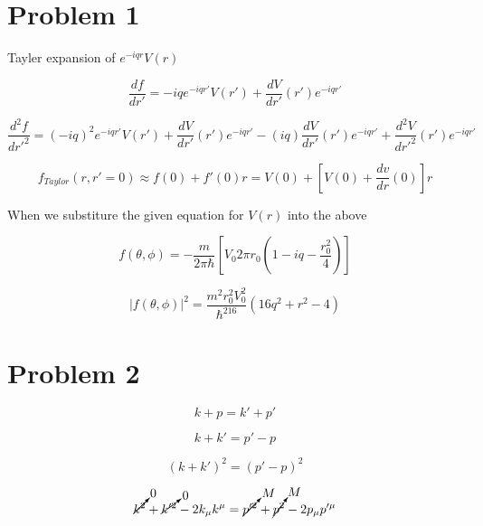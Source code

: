 \documentclass[12pt]{article}
\begin{document}
\maketitle

\section{Problem 1}
Tayler expansion of $e^{-iqr}V(r)$

\begin{equation}
  \frac{df}{dr'}=-iqe^{-iqr'}V(r')+\frac{dV}{dr'}(r')e^{-iqr'}
\end{equation}

\begin{equation}
  \frac{d^2f}{dr'^2}= (-iq)^2e^{-iqr'}V(r') + \frac{dV}{dr'}(r')e^{-iqr'} - (iq)\frac{dV}{dr'}(r')e^{-iqr'} + \frac{d^2V}{dr'^2}(r')e^{-iqr'}  
\end{equation}

\begin{equation}
  f_{Taylor}(r,r'=0) \approx f(0)+f'(0)r= V(0)+[V(0)+\frac{dv}{dr}(0)]r
\end{equation}

When we substiture the given equation for $V(r)$ into the above

\begin{equation}
  f(\theta,\phi)=-\frac{m}{2\pi\hbar}[V_{0}2\pi{r_0}(1-iq-\frac{r_0^2}{4})]
\end{equation}

\begin{equation}
  |f(\theta,\phi)|^2=\frac{m^2r_0^2V_{0}^2}{\hbar^216}(16q^2+r^2-4)
\end{equation}

\section{Problem 2}

\begin{equation}
 k+p=k'+p' 
\end{equation}

\begin{equation}
  k+k'=p'- p
\end{equation}

\begin{equation}
  (k+k')^2=(p'- p)^2
\end{equation}

\begin{equation}
  \cancelto{0}{k^2}+\cancelto{0}{k'^2} -2k_{\mu}k^\mu=\cancelto{M}{p'^2}+\cancelto{M}{p^2} - 2p_\mu p'^\mu
\end{equation}
\end{document}
